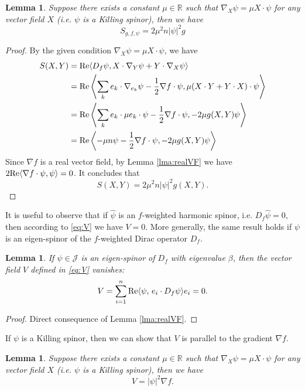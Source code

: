 \documentclass{amsart}
\newtheorem{lemma}[theorem]{Lemma}
\theoremstyle{definition}
\theoremstyle{remark}
\numberwithin{equation}{section}
\newcommand{\abs}[1]{\left|#1\right|}
\newcommand{\R}{\mathbb{R}}
\begin{document}
\begin{lemma}
Suppose there exists a constant $\mu \in \R$ such that $\nabla_X \psi = \mu X \cdot \psi$ for any vector field $X$ (i.e. $\psi$ is a Killing spinor), then we have
\[S_{g,f,\psi} = 2\mu^2 n \abs{\psi}^2 g\]
\end{lemma}

\begin{proof}
By the given condition $\nabla_X \psi = \mu X \cdot \psi$, we have
\begin{align*}
S(X,Y) & = \textup{Re}\langle D_f\psi, X \cdot \nabla_Y \psi + Y \cdot \nabla_X \psi\rangle\\
& = \textup{Re}\left\langle \sum_k e_k \cdot \nabla_{e_k}\psi - \frac{1}{2}\nabla f \cdot \psi , \mu (X \cdot Y + Y \cdot X) \cdot \psi \right\rangle\\
& = \textup{Re}\left\langle \sum_k e_k \cdot \mu e_k \cdot \psi - \frac{1}{2}\nabla f \cdot \psi, -2\mu g(X,Y) \psi\right\rangle\\
& = \textup{Re}\left\langle -\mu n \psi - \frac{1}{2}\nabla f \cdot \psi, -2\mu g(X,Y) \psi\right\rangle
\end{align*}	
Since $\nabla f$ is a real vector field, by Lemma \ref{lma:realVF} we have $2\textup{Re}\langle \nabla f \cdot \psi, \psi \rangle = 0$. It concludes that
\[S(X,Y) = 2\mu^2n \abs{\psi}^2 g(X,Y).\]
\end{proof}



It is useful to observe that if $\hat\psi$ is an $f$-weighted harmonic spinor, i.e. $D_f\hat\psi = 0$, then according to \eqref{eq:V} we have $V = 0$.  More generally, the same result holds if $\psi$ is an eigen-spinor of the $f$-weighted Dirac operator $D_f$.
\begin{lemma}\label{lma:V_zero}
	If $\psi\in\mathcal{J}$ is an eigen-spinor of $D_f$ with eigenvalue $\beta$, then the vector field $V$ defined in \eqref{eq:V} vanishes:
	\[	V=\sum_{i=1}^n\textup{Re}\langle\psi,\, e_i\cdot D_f\psi\rangle e_i = 0.\]
\end{lemma}

\begin{proof}
Direct consequence of Lemma \ref{lma:realVF}.
\end{proof}

If $\psi$ is a Killing spinor, then we can show that $V$ is parallel to the gradient $\nabla f$.
\begin{lemma}
Suppose there exists a constant $\mu \in \R$ such that $\nabla_X \psi = \mu X \cdot \psi$ for any vector field $X$ (i.e. $\psi$ is a Killing spinor), then we have
\[V = \abs{\psi}^2 \nabla f.\]
\end{lemma}
\end{document}
